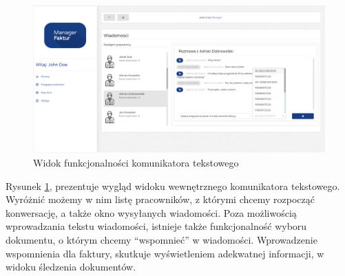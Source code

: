 \begin{figure}[ht]
 \centering
  \includegraphics[width=0.95\linewidth]{rys04/zrzut8}
 \caption{Widok funkcjonalności komunikatora tekstowego}
 \label{fig:gui-webowa-zrzut8}
\end{figure}

Rysunek \ref{fig:gui-webowa-zrzut8}, prezentuje wygląd widoku wewnętrznego komunikatora tekstowego. Wyróżnić możemy w nim listę pracowników, z którymi chcemy rozpocząć konwersację, a także okno wysyłanych wiadomości. Poza możliwością wprowadzania tekstu wiadomości, istnieje także funkcjonalność wyboru dokumentu, o którym chcemy "`wspomnieć"' w wiadomości. Wprowadzenie wspomnienia dla faktury, skutkuje wyświetleniem adekwatnej informacji, w widoku śledzenia dokumentów.

\newpage

